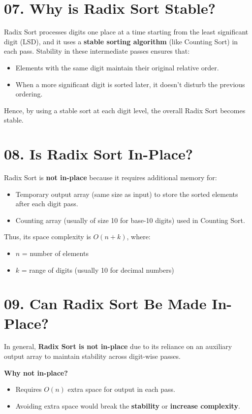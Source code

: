\documentclass[14pt]{extarticle}
\begin{document}
\section*{07. Why is Radix Sort Stable?}
Radix Sort processes digits one place at a time starting from the least significant digit (LSD), and it uses a \textbf{stable sorting algorithm} (like Counting Sort) in each pass. Stability in these intermediate passes ensures that:

\begin{itemize}[leftmargin=1.5em]
    \item Elements with the same digit maintain their original relative order.
    \item When a more significant digit is sorted later, it doesn't disturb the previous ordering.
\end{itemize}

Hence, by using a stable sort at each digit level, the overall Radix Sort becomes stable.

\section*{08. Is Radix Sort In-Place?}
Radix Sort is \textbf{not in-place} because it requires additional memory for:

\begin{itemize}[leftmargin=1.5em]
    \item Temporary output array (same size as input) to store the sorted elements after each digit pass.
    \item Counting array (usually of size 10 for base-10 digits) used in Counting Sort.
\end{itemize}

Thus, its space complexity is $O(n + k)$, where:
\begin{itemize}
    \item $n$ = number of elements
    \item $k$ = range of digits (usually 10 for decimal numbers)
\end{itemize}

\section*{09. Can Radix Sort Be Made In-Place?}
In general, \textbf{Radix Sort is not in-place} due to its reliance on an auxiliary output array to maintain stability across digit-wise passes.

\textbf{Why not in-place?}
\begin{itemize}[leftmargin=1.5em]
    \item Requires $O(n)$ extra space for output in each pass.
    \item Avoiding extra space would break the \textbf{stability} or \textbf{increase complexity}.
\end{itemize}
\end{document}
